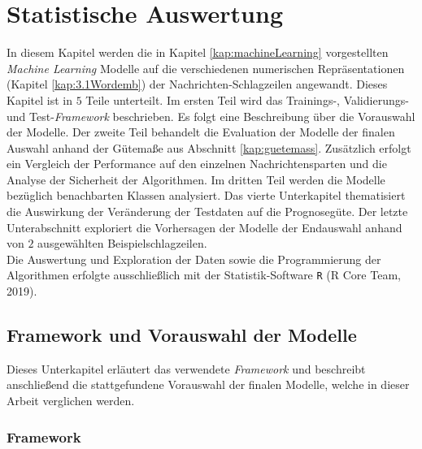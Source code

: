 \documentclass[a4paper,11pt]{article}
\begin{document}
\section{Statistische Auswertung}\label{Kap:statAus}

In diesem Kapitel werden die in Kapitel \ref{kap:machineLearning} vorgestellten \textit{Machine Learning} Modelle auf die verschiedenen numerischen Repräsentationen (Kapitel \ref{kap:3.1Wordemb}) der Nachrichten-Schlagzeilen angewandt. Dieses Kapitel ist in $5$ Teile unterteilt. Im ersten Teil wird das Trainings-, Validierungs- und Test-\textit{Framework} beschrieben. Es folgt eine Beschreibung über die Vorauswahl der Modelle. Der zweite Teil behandelt die Evaluation der Modelle der finalen Auswahl anhand der Gütemaße aus Abschnitt \ref{kap:guetemass}. Zusätzlich erfolgt ein Vergleich der Performance auf den einzelnen Nachrichtensparten und die Analyse der Sicherheit der Algorithmen.
Im dritten Teil werden die Modelle bezüglich benachbarten Klassen analysiert. Das vierte Unterkapitel thematisiert die Auswirkung der Veränderung der Testdaten auf die Prognosegüte.
Der letzte Unterabschnitt exploriert die Vorhersagen der Modelle der Endauswahl anhand von $2$ ausgewählten Beispielschlagzeilen.\\
Die Auswertung und Exploration der Daten sowie die Programmierung der Algorithmen erfolgte ausschließlich mit der Statistik-Software \texttt{R} (R Core Team, 2019).

\subsection{Framework und Vorauswahl der Modelle}

Dieses Unterkapitel erläutert das verwendete \textit{Framework} und beschreibt anschließend die stattgefundene Vorauswahl der finalen Modelle, welche in dieser Arbeit verglichen werden.

\subsubsection{Framework}
\end{document}
